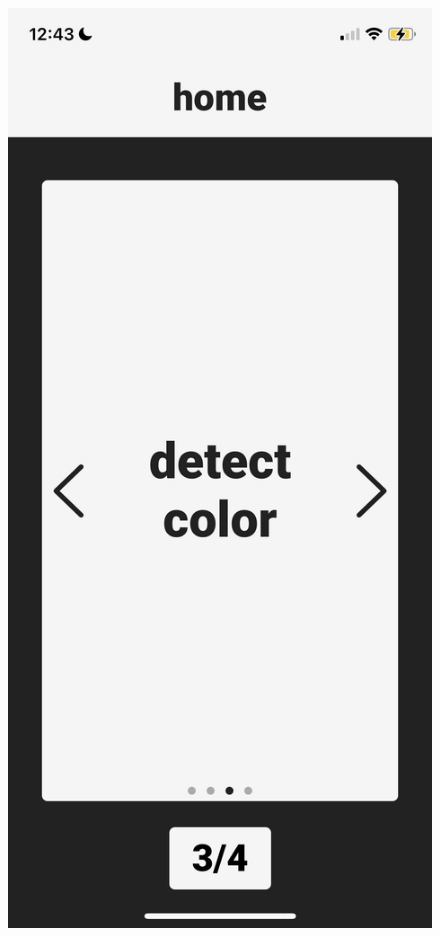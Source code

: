 \documentclass[a4paper,11pt]{article}
\begin{document}
\begin{figure}[H]
\includegraphics[scale=0.1]{img/app/landing3.png}

\end{figure}
\end{document}
